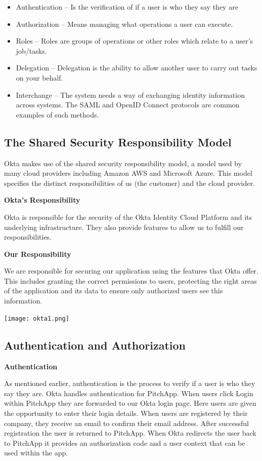 \begin{itemize}
	\item Authentication – Is the verification of if a user is who they say they are
	\item Authorization – Means managing what operations a user can execute.
	\item Roles – Roles are groups of operations or other roles which relate to a user’s job/tasks.
	\item Delegation – Delegation is the ability to allow another user to carry out tasks on your behalf.
	\item Interchange – The system needs a way of exchanging identity information across systems. The SAML and OpenID Connect protocols are common examples of such methods.
\end{itemize}

\subsection{The Shared Security Responsibility Model}

Okta makes use of the shared security responsibility model, a model used by many cloud providers including Amazon AWS and Microsoft Azure. This model specifies the distinct responsibilities of us (the customer) and the cloud provider.

\textbf{Okta's Responsibility}

Okta is responsible for the security of the Okta Identity Cloud Platform and its underlying infrastructure. They also provide features to allow us to fulfill our responsibilities.

\textbf{Our Responsibility}

We are responsible for securing our application using the features that Okta offer. This includes granting the correct permissions to users, protecting the right areas of the application and its data to ensure only authorized users see this information.

\begin{center}
	\texttt{[image: okta1.png]}
\end{center}

\subsection{Authentication and Authorization}

\textbf{Authentication}

As mentioned earlier, authentication is the process to verify if a user is who they say they are. Okta handles authentication for PitchApp. When users click Login within PitchApp they are forwarded to our Okta login page. Here users are given the opportunity to enter their login details. When users are registered by their company, they receive an email to confirm their email address. After successful registration the user is returned to PitchApp. When Okta redirects the user back to PitchApp it provides an authorization code and a user context that can be used within the app.

